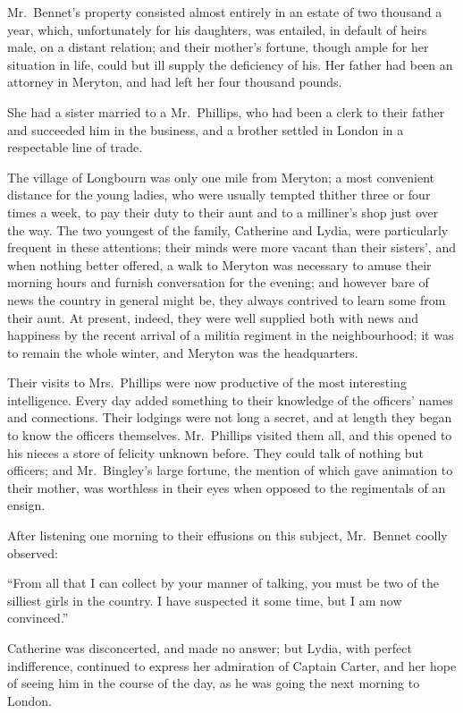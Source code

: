 \documentclass[12pt,english,oneside]{book}
\begin{document}
Mr.\ Bennet's property consisted almost entirely in an estate of
two thousand a year, which, unfortunately for his daughters, was entailed,
in default of heirs male, on a distant relation; and their mother's
fortune, though ample for her situation in life, could but ill supply
the deficiency of his. Her father had been an attorney in Meryton,
and had left her four thousand pounds.

She had a sister married to a Mr.\ Phillips, who had been a clerk
to their father and succeeded him in the business, and a brother settled
in London in a respectable line of trade.

The village of Longbourn was only one mile from Meryton; a most convenient
distance for the young ladies, who were usually tempted thither three
or four times a week, to pay their duty to their aunt and to a milliner's
shop just over the way. The two youngest of the family, Catherine
and Lydia, were particularly frequent in these attentions; their minds
were more vacant than their sisters', and when nothing better offered,
a walk to Meryton was necessary to amuse their morning hours and furnish
conversation for the evening; and however bare of news the country
in general might be, they always contrived to learn some from their
aunt. At present, indeed, they were well supplied both with news and
happiness by the recent arrival of a militia regiment in the neighbourhood;
it was to remain the whole winter, and Meryton was the headquarters.

Their visits to Mrs.\ Phillips were now productive of the most interesting
intelligence. Every day added something to their knowledge of the
officers' names and connections. Their lodgings were not long a secret,
and at length they began to know the officers themselves. Mr.\ Phillips
visited them all, and this opened to his nieces a store of felicity
unknown before. They could talk of nothing but officers; and Mr.\ Bingley's
large fortune, the mention of which gave animation to their mother,
was worthless in their eyes when opposed to the regimentals of an
ensign.

After listening one morning to their effusions on this subject, Mr.\ 
Bennet coolly observed:

{}``From all that I can collect by your manner of talking, you must
be two of the silliest girls in the country. I have suspected it some
time, but I am now convinced.''

Catherine was disconcerted, and made no answer; but Lydia, with perfect
indifference, continued to express her admiration of Captain Carter,
and her hope of seeing him in the course of the day, as he was going
the next morning to London.
\end{document}
